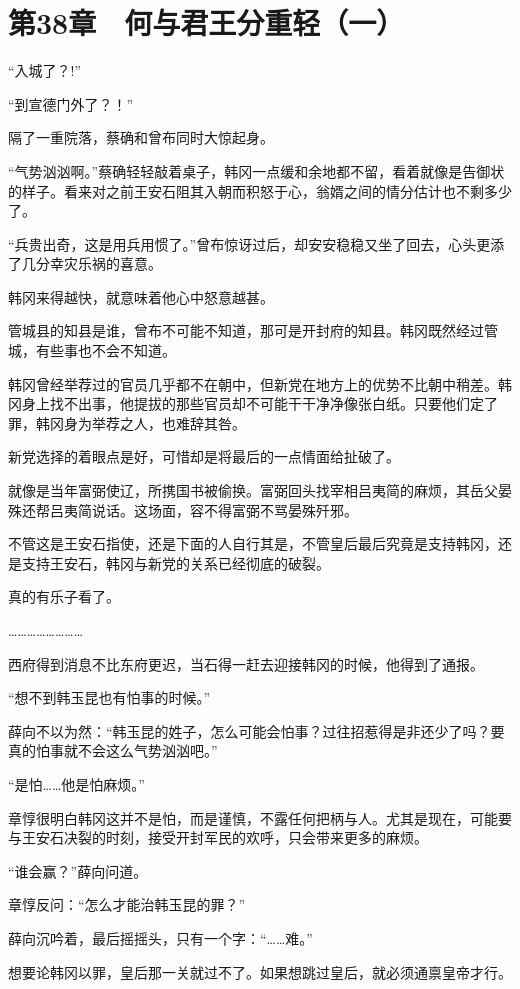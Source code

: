 \section{第38章　何与君王分重轻（一）}

“入城了？!”

“到宣德门外了？！”

隔了一重院落，蔡确和曾布同时大惊起身。

“气势汹汹啊。”蔡确轻轻敲着桌子，韩冈一点缓和余地都不留，看着就像是告御状的样子。看来对之前王安石阻其入朝而积怒于心，翁婿之间的情分估计也不剩多少了。

“兵贵出奇，这是用兵用惯了。”曾布惊讶过后，却安安稳稳又坐了回去，心头更添了几分幸灾乐祸的喜意。

韩冈来得越快，就意味着他心中怒意越甚。

管城县的知县是谁，曾布不可能不知道，那可是开封府的知县。韩冈既然经过管城，有些事也不会不知道。

韩冈曾经举荐过的官员几乎都不在朝中，但新党在地方上的优势不比朝中稍差。韩冈身上找不出事，他提拔的那些官员却不可能干干净净像张白纸。只要他们定了罪，韩冈身为举荐之人，也难辞其咎。

新党选择的着眼点是好，可惜却是将最后的一点情面给扯破了。

就像是当年富弼使辽，所携国书被偷换。富弼回头找宰相吕夷简的麻烦，其岳父晏殊还帮吕夷简说话。这场面，容不得富弼不骂晏殊歼邪。

不管这是王安石指使，还是下面的人自行其是，不管皇后最后究竟是支持韩冈，还是支持王安石，韩冈与新党的关系已经彻底的破裂。

真的有乐子看了。

……………………

西府得到消息不比东府更迟，当石得一赶去迎接韩冈的时候，他得到了通报。

“想不到韩玉昆也有怕事的时候。”

薛向不以为然：“韩玉昆的姓子，怎么可能会怕事？过往招惹得是非还少了吗？要真的怕事就不会这么气势汹汹吧。”

“是怕……他是怕麻烦。”

章惇很明白韩冈这并不是怕，而是谨慎，不露任何把柄与人。尤其是现在，可能要与王安石决裂的时刻，接受开封军民的欢呼，只会带来更多的麻烦。

“谁会赢？”薛向问道。

章惇反问：“怎么才能治韩玉昆的罪？”

薛向沉吟着，最后摇摇头，只有一个字：“……难。”

想要论韩冈以罪，皇后那一关就过不了。如果想跳过皇后，就必须通禀皇帝才行。

